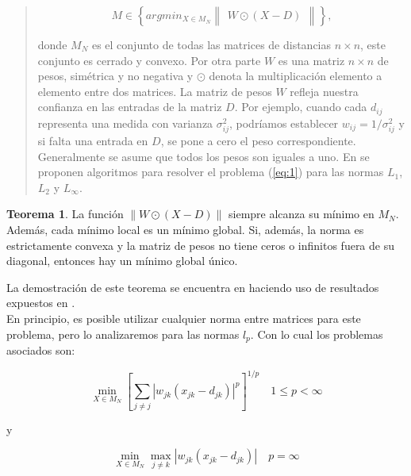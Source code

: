\documentclass[12pt]{report} %
\theoremstyle{definition}
\newtheorem{theorem}{Teorema}[section]
\newcommand{\norm}[1]{\left\lVert#1\right\rVert}
\begin{document}
{\begin{quotation}
\begin{equation}
\textit{M} \in \left\lbrace argmin_{X \in M_N} \begin{Vmatrix} W \odot (X-D) \end{Vmatrix} \right\rbrace, \label{eq:1}
\end{equation}

\noindent donde $M_N$ es el conjunto de todas las matrices de distancias $n \times n$, este conjunto es cerrado y convexo. Por otra parte $W$ es una matriz $n \times n$ de pesos, simétrica y no negativa y $\odot$ denota la multiplicación elemento a elemento entre dos matrices. La matriz de pesos $W$ refleja nuestra confianza en las entradas de la matriz $D$. Por ejemplo, cuando cada $d_{ij}$ representa una medida con varianza $\sigma_{ij}^2$, podríamos establecer $w_{ij} = 1 / \sigma_{ij}^2 $ y si falta una entrada en $D$, se pone a cero el peso correspondiente. Generalmente se asume que todos los pesos son iguales a uno. En \cite{TheMetricNearnessProblem} se proponen algoritmos para resolver el problema (\ref{eq:1}) para las normas $L_1$, $L_2$ y $L_\infty$.

\end{quotation}

\begin{theorem} 
	La función $\norm{ W \odot (X-D)}$ siempre alcanza su mínimo en $M_N$. Además, cada mínimo local es un mínimo global. Si, además, la norma es estrictamente convexa y la matriz de pesos no tiene ceros o infinitos fuera de su diagonal, entonces hay un mínimo global único.
\end{theorem}

La demostración de este teorema se encuentra en \cite{MetricNearnessProblemApplications} haciendo uso de resultados expuestos en \cite{ConvexAnalysis}.\\

En principio, es posible utilizar cualquier norma entre matrices para este problema, pero lo analizaremos para las normas $l_p$. Con lo cual los problemas asociados son:

\begin{equation}
\min_{X \in M_N} \left[ \sum_{j \neq j}  \left| w_{jk}(x_{jk} - d_{jk}) \right| ^p  \right]^{1/p}  \quad  1 \leq p < \infty \label{p=1}
\end{equation}

\noindent y

\begin{equation}
\min_{X \in M_N} \max_{j\neq k} \left| w_{jk}(x_{jk} - d_{jk}) \right| \quad  p = \infty \label{p=inf}
\end{equation}

}
\end{document}
